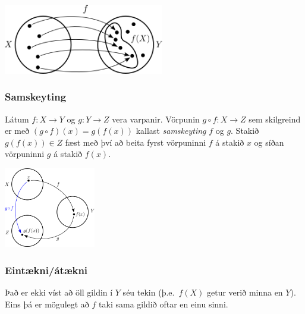 \documentclass[icelandic,a4paper,12pt]{article}
\begin{document}
\begin{center}
 \includegraphics[width=7cm,keepaspectratio=true]{./myndir/kafli01/02_Mynd_vorpunar.png}
\end{center}


\subsubsection*{Samskeyting}
Látum $f:X \to Y$ og $g:Y \to Z$ vera varpanir. Vörpunin 
$g\circ f:X \to Z$ sem skilgreind er með 
$(g\circ f)(x)=g(f(x))$ kallast \emph{samskeyting} $f$ og 
$g$. 
Stakið 
$g(f(x)) \in Z$ fæst með því að beita fyrst vörpuninni $f$ á stakið 
$x$ og síðan vörpuninni $g$ á stakið $f(x)$.

% 
\begin{center}
 \includegraphics[width=4cm,keepaspectratio=true]{./myndir/kafli01/02_Samskeyting.png}
\end{center}



\subsubsection*{Eintækni/átækni}
Það er ekki víst að öll gildin í $Y$ séu tekin (þ.e.~$f(X)$
getur verið minna en $Y$). Eins þá er mögulegt að $f$
taki sama gildið oftar en einu sinni.
\end{document}

